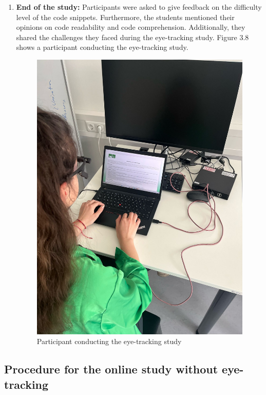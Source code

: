 \begin{enumerate}
    \item \textbf{End of the study:} 
    Participants were asked to give feedback on the difficulty level of the code snippets. Furthermore, the students mentioned their opinions on code readability and code comprehension. Additionally, they shared the challenges they faced during the eye-tracking study. Figure 3.8 shows a participant conducting the eye-tracking study.


\begin{figure} [H]
  \centering
  \includegraphics[scale=0.2]{figures/user.jpg}
  \caption{Participant conducting the eye-tracking study }
  \label{fig:AnhangsChor}
\end{figure}



\end{enumerate}



\subsection{Procedure for the online study without eye-tracking}


